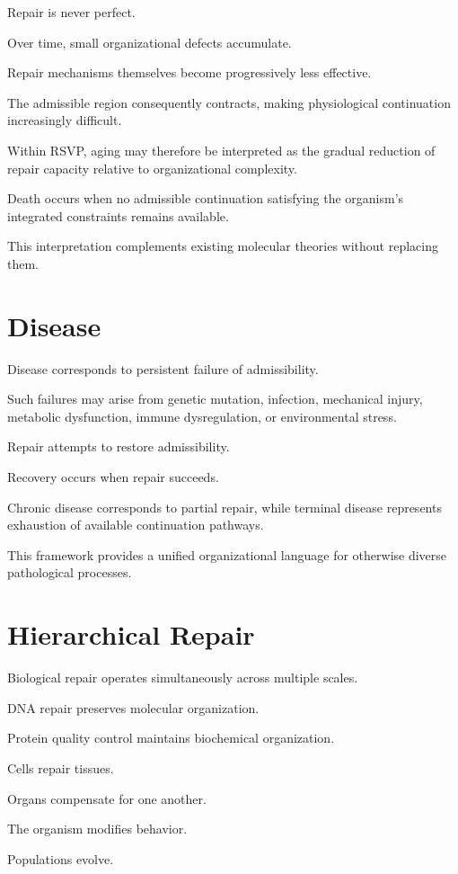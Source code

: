 \documentclass[11pt,oneside]{book}
\numberwithin{equation}{chapter}
\theoremstyle{definition}
\theoremstyle{plain}
\begin{document}
Repair is never perfect.

Over time, small organizational defects accumulate.

Repair mechanisms themselves become progressively less effective.

The admissible region consequently contracts, making physiological
continuation increasingly difficult.

Within RSVP, aging may therefore be interpreted as the gradual reduction of
repair capacity relative to organizational complexity.

Death occurs when no admissible continuation satisfying the organism's
integrated constraints remains available.

This interpretation complements existing molecular theories without
replacing them.

\section{Disease}

Disease corresponds to persistent failure of admissibility.

Such failures may arise from genetic mutation, infection, mechanical injury,
metabolic dysfunction, immune dysregulation, or environmental stress.

Repair attempts to restore admissibility.

Recovery occurs when repair succeeds.

Chronic disease corresponds to partial repair, while terminal disease
represents exhaustion of available continuation pathways.

This framework provides a unified organizational language for otherwise
diverse pathological processes.

\section{Hierarchical Repair}

Biological repair operates simultaneously across multiple scales.

DNA repair preserves molecular organization.

Protein quality control maintains biochemical organization.

Cells repair tissues.

Organs compensate for one another.

The organism modifies behavior.

Populations evolve.
\end{document}
